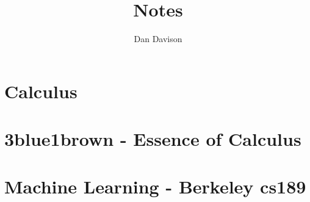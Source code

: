 \documentclass{book}
\title{Notes}
\author{Dan Davison}
\begin{document}
\frontmatter
\maketitle
\tableofcontents
\mainmatter
\chapter{Calculus}


\chapter{3blue1brown - Essence of Calculus}


\chapter{Machine Learning - Berkeley cs189}


\end{document}

